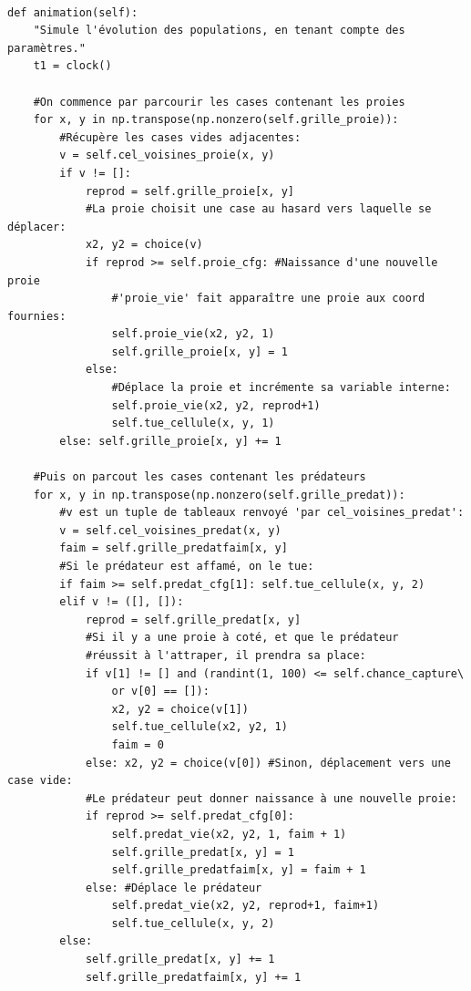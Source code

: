 \documentclass[11pt]{article}
\begin{document}
\begin{verbatim}

def animation(self):
    "Simule l'évolution des populations, en tenant compte des paramètres."
    t1 = clock()
    
    #On commence par parcourir les cases contenant les proies
    for x, y in np.transpose(np.nonzero(self.grille_proie)):    
        #Récupère les cases vides adjacentes:
        v = self.cel_voisines_proie(x, y)   
        if v != []:
            reprod = self.grille_proie[x, y]
            #La proie choisit une case au hasard vers laquelle se déplacer:
            x2, y2 = choice(v)  
            if reprod >= self.proie_cfg: #Naissance d'une nouvelle proie
                #'proie_vie' fait apparaître une proie aux coord fournies:
                self.proie_vie(x2, y2, 1) 
                self.grille_proie[x, y] = 1
            else: 
                #Déplace la proie et incrémente sa variable interne:
                self.proie_vie(x2, y2, reprod+1) 
                self.tue_cellule(x, y, 1)
        else: self.grille_proie[x, y] += 1
    
    #Puis on parcout les cases contenant les prédateurs
    for x, y in np.transpose(np.nonzero(self.grille_predat)):
        #v est un tuple de tableaux renvoyé 'par cel_voisines_predat':
        v = self.cel_voisines_predat(x, y) 
        faim = self.grille_predatfaim[x, y]
        #Si le prédateur est affamé, on le tue:
        if faim >= self.predat_cfg[1]: self.tue_cellule(x, y, 2)    
        elif v != ([], []):
            reprod = self.grille_predat[x, y]
            #Si il y a une proie à coté, et que le prédateur 
            #réussit à l'attraper, il prendra sa place:
            if v[1] != [] and (randint(1, 100) <= self.chance_capture\
                or v[0] == []): 
                x2, y2 = choice(v[1])
                self.tue_cellule(x2, y2, 1)
                faim = 0
            else: x2, y2 = choice(v[0]) #Sinon, déplacement vers une case vide:
            #Le prédateur peut donner naissance à une nouvelle proie:
            if reprod >= self.predat_cfg[0]: 
                self.predat_vie(x2, y2, 1, faim + 1)
                self.grille_predat[x, y] = 1
                self.grille_predatfaim[x, y] = faim + 1
            else: #Déplace le prédateur
                self.predat_vie(x2, y2, reprod+1, faim+1)
                self.tue_cellule(x, y, 2)
        else: 
            self.grille_predat[x, y] += 1
            self.grille_predatfaim[x, y] += 1
    

\end{verbatim}
\end{document}
